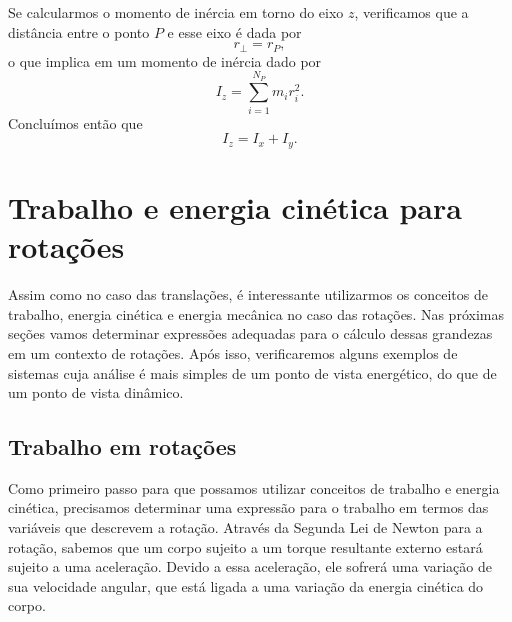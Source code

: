Se calcularmos o momento de inércia em torno do eixo $z$, verificamos que a distância entre o ponto $P$ e esse eixo é dada por
\begin{equation}
    r_\perp = r_P,
\end{equation}
%
o que implica em um momento de inércia dado por
\begin{equation}
    I_z = \sum_{i = 1}^{N_P} m_i r_i^2.
\end{equation}
%
Concluímos então que
\begin{equation}
    I_z = I_x + I_y.
\end{equation}



\section{Trabalho e energia cinética para rotações}

Assim como no caso das translações, é interessante utilizarmos os conceitos de trabalho, energia cinética e energia mecânica no caso das rotações. Nas próximas seções vamos determinar expressões adequadas para o cálculo dessas grandezas em um contexto de rotações. Após isso, verificaremos alguns exemplos de sistemas cuja análise é mais simples de um ponto de vista energético, do que de um ponto de vista dinâmico.

\subsection{Trabalho em rotações}

Como primeiro passo para que possamos utilizar conceitos de trabalho e energia cinética, precisamos determinar uma expressão para o trabalho em termos das variáveis que descrevem a rotação. Através da Segunda Lei de Newton para a rotação, sabemos que um corpo sujeito a um torque resultante externo estará sujeito a uma aceleração. Devido a essa aceleração, ele sofrerá uma variação de sua velocidade angular, que está ligada a uma variação da energia cinética do corpo.

